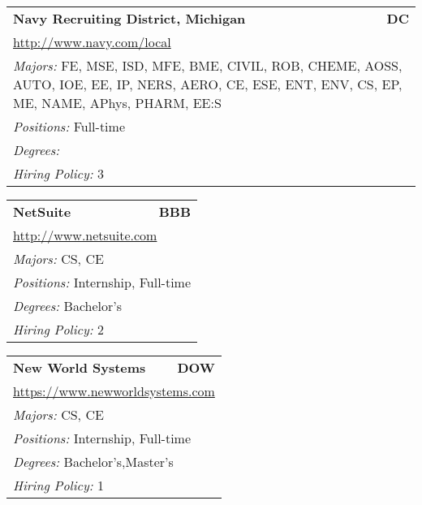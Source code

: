 \documentclass[twoside]{article}
\begin{document}
\begin{center}
\begin{multicols}{3}
\begin{FlushLeft}
\begin{minipage}{\columnwidth}
\end{minipage}
 
\begin{minipage}{\columnwidth}\begin{tabularx}{.95\columnwidth}{Xr}
                 {\Large\bf Navy Recruiting District, Michigan} & {\Large\bf DC}\\
    \multicolumn{2}{p{.95\columnwidth}}{\url{http://www.navy.com/local}}\\
    \multicolumn{2}{p{.95\columnwidth}}{\emph{Majors:} FE, MSE, ISD, MFE, BME, CIVIL, ROB, CHEME, AOSS, AUTO, IOE, EE, IP, NERS, AERO, CE, ESE, ENT, ENV, CS, EP, ME, NAME, APhys, PHARM, EE:S}\\
    \multicolumn{2}{p{.95\columnwidth}}{\emph{Positions:} Full-time}\\
    \multicolumn{2}{p{.95\columnwidth}}{\emph{Degrees:} }\\
    \multicolumn{2}{p{.95\columnwidth}}{\emph{Hiring Policy:} 3}\\
    \end{tabularx}
    
\end{minipage}
 
\begin{minipage}{\columnwidth}\begin{tabularx}{.95\columnwidth}{Xr}
                 {\Large\bf NetSuite} & {\Large\bf BBB}\\
    \multicolumn{2}{p{.95\columnwidth}}{\url{http://www.netsuite.com}}\\
    \multicolumn{2}{p{.95\columnwidth}}{\emph{Majors:} CS, CE}\\
    \multicolumn{2}{p{.95\columnwidth}}{\emph{Positions:} Internship, Full-time}\\
    \multicolumn{2}{p{.95\columnwidth}}{\emph{Degrees:} Bachelor's}\\
    \multicolumn{2}{p{.95\columnwidth}}{\emph{Hiring Policy:} 2}\\
    \end{tabularx}
    
\end{minipage}
 
\begin{minipage}{\columnwidth}\begin{tabularx}{.95\columnwidth}{Xr}
                 {\Large\bf New World Systems} & {\Large\bf DOW}\\
    \multicolumn{2}{p{.95\columnwidth}}{\url{https://www.newworldsystems.com}}\\
    \multicolumn{2}{p{.95\columnwidth}}{\emph{Majors:} CS, CE}\\
    \multicolumn{2}{p{.95\columnwidth}}{\emph{Positions:} Internship, Full-time}\\
    \multicolumn{2}{p{.95\columnwidth}}{\emph{Degrees:} Bachelor's,Master's}\\
    \multicolumn{2}{p{.95\columnwidth}}{\emph{Hiring Policy:} 1}\\
    \end{tabularx}
    

\end{minipage}
\end{FlushLeft}
\end{multicols}
\end{center}
\end{document}

